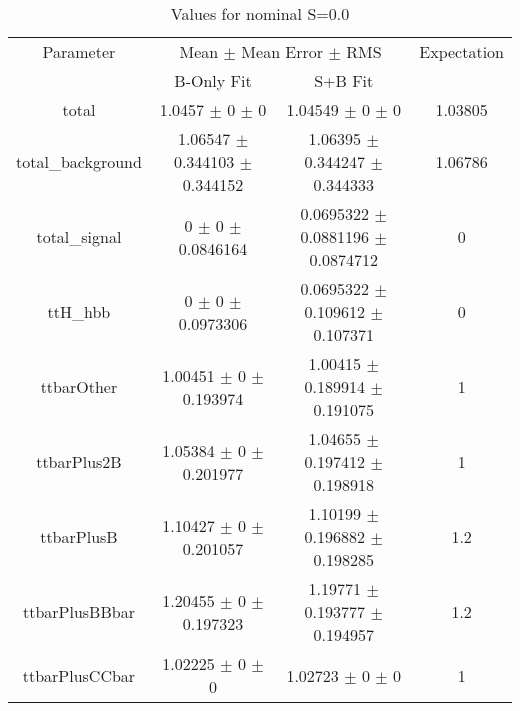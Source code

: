 \begin{table}
\centering
\caption{Values for nominal S=0.0}
\begin{tabular}{cccc}
\toprule
Parameter & \multicolumn{2}{c}{Mean $\pm$ Mean Error $\pm$ RMS} & Expectation\\
 & B-Only Fit & S+B Fit & \\
\midrule
total & \num{1.0457} $\pm$ \num{0} $\pm$ \num{0} & \num{1.04549} $\pm$ \num{0} $\pm$ \num{0} & \num{1.03805}\\
total\_background & \num{1.06547} $\pm$ \num{0.344103} $\pm$ \num{0.344152} & \num{1.06395} $\pm$ \num{0.344247} $\pm$ \num{0.344333} & \num{1.06786}\\
total\_signal & \num{0} $\pm$ \num{0} $\pm$ \num{0.0846164} & \num{0.0695322} $\pm$ \num{0.0881196} $\pm$ \num{0.0874712} & \num{0}\\
ttH\_hbb & \num{0} $\pm$ \num{0} $\pm$ \num{0.0973306} & \num{0.0695322} $\pm$ \num{0.109612} $\pm$ \num{0.107371} & \num{0}\\
ttbarOther & \num{1.00451} $\pm$ \num{0} $\pm$ \num{0.193974} & \num{1.00415} $\pm$ \num{0.189914} $\pm$ \num{0.191075} & \num{1}\\
ttbarPlus2B & \num{1.05384} $\pm$ \num{0} $\pm$ \num{0.201977} & \num{1.04655} $\pm$ \num{0.197412} $\pm$ \num{0.198918} & \num{1}\\
ttbarPlusB & \num{1.10427} $\pm$ \num{0} $\pm$ \num{0.201057} & \num{1.10199} $\pm$ \num{0.196882} $\pm$ \num{0.198285} & \num{1.2}\\
ttbarPlusBBbar & \num{1.20455} $\pm$ \num{0} $\pm$ \num{0.197323} & \num{1.19771} $\pm$ \num{0.193777} $\pm$ \num{0.194957} & \num{1.2}\\
ttbarPlusCCbar & \num{1.02225} $\pm$ \num{0} $\pm$ \num{0} & \num{1.02723} $\pm$ \num{0} $\pm$ \num{0} & \num{1}\\
\bottomrule
\end{tabular}
\end{table}